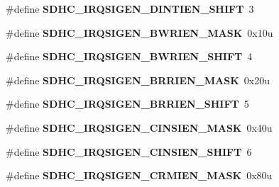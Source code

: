 \begin{DoxyCompactItemize}
\item 
\#define {\bfseries S\+D\+H\+C\+\_\+\+I\+R\+Q\+S\+I\+G\+E\+N\+\_\+\+D\+I\+N\+T\+I\+E\+N\+\_\+\+S\+H\+I\+FT}~3\hypertarget{group__SDHC__Register__Masks_gaafe7e328f182b268af1b86b90f8430c8}{}\label{group__SDHC__Register__Masks_gaafe7e328f182b268af1b86b90f8430c8}

\item 
\#define {\bfseries S\+D\+H\+C\+\_\+\+I\+R\+Q\+S\+I\+G\+E\+N\+\_\+\+B\+W\+R\+I\+E\+N\+\_\+\+M\+A\+SK}~0x10u\hypertarget{group__SDHC__Register__Masks_ga127a20751da5c0a3b1db2619fd29a5bf}{}\label{group__SDHC__Register__Masks_ga127a20751da5c0a3b1db2619fd29a5bf}

\item 
\#define {\bfseries S\+D\+H\+C\+\_\+\+I\+R\+Q\+S\+I\+G\+E\+N\+\_\+\+B\+W\+R\+I\+E\+N\+\_\+\+S\+H\+I\+FT}~4\hypertarget{group__SDHC__Register__Masks_ga5a0a6e7cdb390a6254c3c037d4ea241c}{}\label{group__SDHC__Register__Masks_ga5a0a6e7cdb390a6254c3c037d4ea241c}

\item 
\#define {\bfseries S\+D\+H\+C\+\_\+\+I\+R\+Q\+S\+I\+G\+E\+N\+\_\+\+B\+R\+R\+I\+E\+N\+\_\+\+M\+A\+SK}~0x20u\hypertarget{group__SDHC__Register__Masks_gaa35b18361378457cf175e01abab26611}{}\label{group__SDHC__Register__Masks_gaa35b18361378457cf175e01abab26611}

\item 
\#define {\bfseries S\+D\+H\+C\+\_\+\+I\+R\+Q\+S\+I\+G\+E\+N\+\_\+\+B\+R\+R\+I\+E\+N\+\_\+\+S\+H\+I\+FT}~5\hypertarget{group__SDHC__Register__Masks_ga2911f1a96022342a85da7994dff2a5d9}{}\label{group__SDHC__Register__Masks_ga2911f1a96022342a85da7994dff2a5d9}

\item 
\#define {\bfseries S\+D\+H\+C\+\_\+\+I\+R\+Q\+S\+I\+G\+E\+N\+\_\+\+C\+I\+N\+S\+I\+E\+N\+\_\+\+M\+A\+SK}~0x40u\hypertarget{group__SDHC__Register__Masks_gaddc99f9affd2d06d74e504cb80c3c176}{}\label{group__SDHC__Register__Masks_gaddc99f9affd2d06d74e504cb80c3c176}

\item 
\#define {\bfseries S\+D\+H\+C\+\_\+\+I\+R\+Q\+S\+I\+G\+E\+N\+\_\+\+C\+I\+N\+S\+I\+E\+N\+\_\+\+S\+H\+I\+FT}~6\hypertarget{group__SDHC__Register__Masks_gafab5ab5bba2d9d1148ad0434126f1fb2}{}\label{group__SDHC__Register__Masks_gafab5ab5bba2d9d1148ad0434126f1fb2}

\item 
\#define {\bfseries S\+D\+H\+C\+\_\+\+I\+R\+Q\+S\+I\+G\+E\+N\+\_\+\+C\+R\+M\+I\+E\+N\+\_\+\+M\+A\+SK}~0x80u\hypertarget{group__SDHC__Register__Masks_gaafb12fb025305f900bdf9df041dca2b3}{}\label{group__SDHC__Register__Masks_gaafb12fb025305f900bdf9df041dca2b3}


\end{DoxyCompactItemize}
